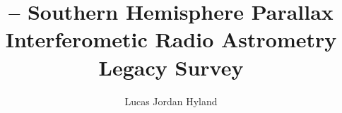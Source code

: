 


\titlepgtrue %
\signaturepagetrue %
\copyrighttrue %
\abswithesistrue %
\acktrue %
\tablecontentstrue %
\tablespagetrue %
\figurespagetrue %


\title{\spirals -- Southern Hemisphere Parallax Interferometic Radio Astrometry Legacy Survey} 
\author{Lucas Jordan Hyland} 

